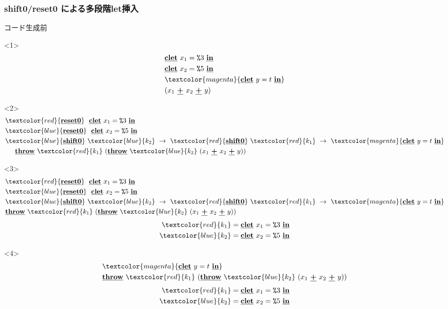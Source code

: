 \documentclass[dvipdfmx,cjk,xcolor=dvipsnames,envcountsect,notheorems,12pt]{beamer}
\newcommand\cResetz{\underline{\textbf{reset0}}}
\newcommand\cShiftz{\underline{\textbf{shift0}}}
\newcommand\cThrow{\underline{\textbf{throw}}}
\newcommand\cPlus{\underline{\textbf{+}}}
\newcommand\cLet{\underline{\textbf{clet}}}
\newcommand\cIn{\underline{\textbf{in}}}
\newcommand\csp[1]{\texttt{\%}{#1}}
\newcommand\red[1]{\textcolor{red}{#1}}
\newcommand\magenta[1]{\textcolor{magenta}{#1}}
\newcommand\blue[1]{\textcolor{blue}{#1}}
\theoremstyle{definition}
\begin{document}
\begin{frame}
  \frametitle{shift0/reset0 による多段階let挿入}
  コード生成前
  \begin{onlyenv}<1>
    \begin{align*}
      & \cLet~x_1=\csp{3}~\cIn \\
      & \cLet~x_2=\csp{5}~\cIn \\
      & \magenta{\cLet~y=t~\cIn} \\
      & (x_1~\cPlus~x_2~\cPlus~y)
    \end{align*}
  \end{onlyenv}

  \begin{onlyenv}<2>
    \begin{align*}
      & \red{\cResetz} ~~\cLet~x_1=\csp{3}~\cIn \\
      & \blue{\cResetz} ~~\cLet~x_2=\csp{5}~\cIn \\
      & \blue{\cShiftz}~\blue{k_2}~\to~ \red{\cShiftz}~\red{k_1}~\to~ \magenta{\cLet~y=t~\cIn} \\
      & \phantom{=}~~ \cThrow~\red{k_1}~(\cThrow~\blue{k_2}~(x_1~\cPlus~x_2~\cPlus~y))
    \end{align*}
  \end{onlyenv}

  \begin{onlyenv}<3>
    \begin{align*}
      & \red{\cResetz} ~~\cLet~x_1=\csp{3}~\cIn \\
      & \blue{\cResetz} ~~\cLet~x_2=\csp{5}~\cIn \\
      & \blue{\cShiftz}~\blue{k_2}~\to~ \red{\cShiftz}~\red{k_1}~\to~ \magenta{\cLet~y=t~\cIn} \\
      & \cThrow~\red{k_1}~(\cThrow~\blue{k_2}~(x_1~\cPlus~x_2~\cPlus~y))
    \end{align*}
    \begin{align*}
      \red{k_1} &= \cLet~x_1=\csp{3}~\cIn  \\
      \blue{k_2} &= \cLet~x_2=\csp{5}~\cIn  \\
    \end{align*}
  \end{onlyenv}

  \begin{onlyenv}<4>
    \begin{align*}
      & \magenta{\cLet~y=t~\cIn} \\
      & \cThrow~\red{k_1}~(\cThrow~\blue{k_2}~(x_1~\cPlus~x_2~\cPlus~y))
    \end{align*}
    \begin{align*}
      \red{k_1} &= \cLet~x_1=\csp{3}~\cIn  \\
      \blue{k_2} &= \cLet~x_2=\csp{5}~\cIn  \\
    \end{align*}
  \end{onlyenv}


\end{frame}
\end{document}
